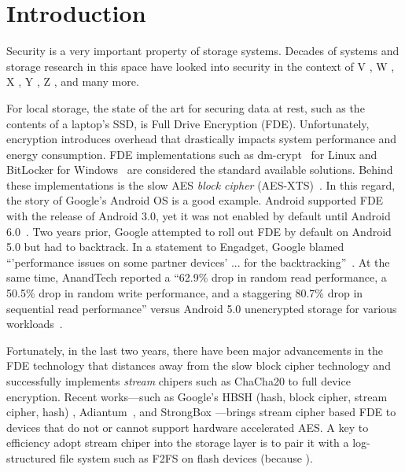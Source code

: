 \section{Introduction} \label{sec:introduction}




Security is a very important property of storage systems.  Decades of 
systems and storage research in this space have looked into security in the context of 
V \cite{v1, v2, v3}, 
W \cite{w1, w2, w3}, 
X \cite{x1, x2, x3}, 
Y \cite{y1, y2, y3}, 
Z \cite{z1, z2, z3}, and many more.


For local storage, the state of the art for securing data at rest, such as
the contents of a laptop's SSD, is Full Drive Encryption (FDE).
Unfortunately, encryption introduces overhead that drastically impacts
system performance and energy consumption.  FDE implementations such as
dm-crypt~\cite{dmcrypt,DmC-Android} for Linux and BitLocker for
Windows~\cite{bitlocker} are considered the standard available solutions.
Behind these implementations is the slow AES \emph{block cipher}
(AES-XTS)~\cite{XTS, XTSComments, NISTXTS}.  In this regard, the story of
Google's Android OS is a good example. Android supported FDE with the
release of Android 3.0, yet it was not enabled by default until Android
6.0~\cite{android-M-mobile-motivation}. Two years prior, Google attempted
to roll out FDE by default on Android 5.0 but had to backtrack. In a
statement to Engadget, Google blamed ``'performance issues on some partner
devices' ... for the backtracking''~\cite{google-engadget}. At the same
time, AnandTech reported a ``62.9\% drop in random read performance, a
50.5\% drop in random write performance, and a staggering 80.7\% drop in
sequential read performance'' versus Android 5.0 unencrypted storage for
various workloads~\cite{android-M-mobile-motivation-2}.



Fortunately, in the last two years, there have been major advancements in
the FDE technology that distances away from the slow block cipher
technology and successfully implements {\em stream} chipers such as
ChaCha20 to full device encryption.  Recent works---such as Google's HBSH
(hash, block cipher, stream cipher, hash) \cite{hbsh-citation???},
Adiantum~\cite{Adiantum}, and StrongBox \cite{StrongBox}---brings stream
cipher based FDE to devices that do not or cannot support hardware
accelerated AES.  A key to efficiency adopt stream chiper into the storage
layer is to pair it with a log-structured file system such as F2FS
on flash devices (because ).


